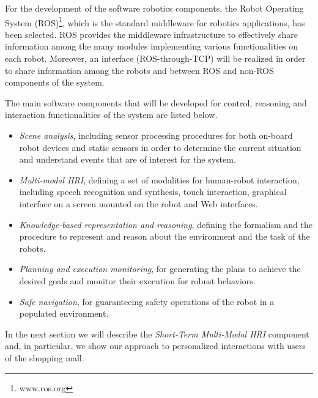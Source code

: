 For the development of the software robotics components, the Robot Operating System (ROS)\footnote{www.ros.org}, which is the standard middleware for robotics applications, has been selected.
ROS provides the middleware infrastructure to effectively share information among the many modules implementing various functionalities on each robot. Moreover, an interface (ROS-through-TCP) will be realized in order to share information among the robots and between ROS and non-ROS components of the system.

The main software components that will be developed for control, reasoning and interaction functionalities of the system are listed below.

\begin{itemize}
\item \emph{Scene analysis}, including sensor processing procedures for both on-board robot devices and static sensors in order to determine the current situation and understand events that are of interest for the system.

\item \emph{Multi-modal HRI}, defining a set of modalities for human-robot interaction, including speech recognition and synthesis, touch interaction, graphical interface on a screen mounted on the robot and Web interfaces.

\item \emph{Knowledge-based representation and reasoning}, defining the formalism and the procedure to represent and reason about the environment and the task of the robots.

\item \emph{Planning and execution monitoring}, for generating the plans to achieve the desired goals and monitor their execution for robust behaviors.

\item \emph{Safe navigation}, for guaranteeing safety operations of the robot in a populated environment.

\end{itemize}

In the next section we will describe the \emph{Short-Term Multi-Modal HRI} component
and, in particular, we show our approach to personalized interactions with users of the shopping mall.

